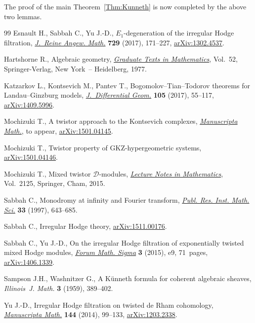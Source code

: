 \documentclass[11pt]{article}
\begin{document}
The proof of the main Theorem~\ref{Thm:Kunneth} is now completed by the above two lemmas.
\begin{thebibliography}{99}
Esnault H., Sabbah C., Yu J.-D., {$E_1$}-degeneration of the irregular {H}odge
 filtration, \href{https://doi.org/10.1515/crelle-2014-0118}{\textit{J.~Reine Angew. Math.}} \textbf{729} (2017), 171--227,
 \href{https://arxiv.org/abs/1302.4537}{arXiv:1302.4537}.

Hartshorne R., Algebraic geometry, \href{https://doi.org/10.1007/978-1-4757-3849-0}{\textit{Graduate Texts in Mathematics}}, Vol.~52, Springer-Verlag, New York~--
 Heidelberg, 1977.

Katzarkov L., Kontsevich M., Pantev T., Bogomolov--{T}ian--{T}odorov theorems
 for {L}andau--{G}inzburg models, \href{https://doi.org/10.4310/jdg/1483655860}{\textit{J.~Differential Geom.}} \textbf{105}
 (2017), 55--117, \href{https://arxiv.org/abs/1409.5996}{arXiv:1409.5996}.

Mochizuki T., A twistor approach to the {K}ontsevich complexes,
 \href{https://doi.org/10.1007/s00229-017-0989-5}{\textit{Manuscripta Math.}}, {t}o appear, \href{https://arxiv.org/abs/1501.04145}{arXiv:1501.04145}.

Mochizuki T., Twistor property of {GKZ}-hypergeometric systems,
 \href{https://arxiv.org/abs/1501.04146}{arXiv:1501.04146}.

Mochizuki T., Mixed twistor {$\mathcal D$}-modules, \href{https://doi.org/10.1007/978-3-319-10088-3}{\textit{Lecture Notes in
 Mathematics}}, Vol.~2125, Springer, Cham, 2015.

Sabbah C., Monodromy at infinity and {F}ourier transform, \href{https://doi.org/10.2977/prims/1195145150}{\textit{Publ. Res.
 Inst. Math. Sci.}} \textbf{33} (1997), 643--685.

Sabbah C., Irregular {H}odge theory, \href{https://arxiv.org/abs/1511.00176}{arXiv:1511.00176}.

Sabbah C., Yu J.-D., On the irregular {H}odge filtration of exponentially
 twisted mixed {H}odge modules, \href{https://doi.org/10.1017/fms.2015.8}{\textit{Forum Math. Sigma}} \textbf{3} (2015),
 e9, 71~pages, \href{https://arxiv.org/abs/1406.1339}{arXiv:1406.1339}.

Sampson J.H., Washnitzer G., A {K}\"unneth formula for coherent algebraic
 sheaves, \textit{Illinois~J. Math.} \textbf{3} (1959), 389--402.

Yu J.-D., Irregular {H}odge filtration on twisted de {R}ham cohomology,
 \href{https://doi.org/10.1007/s00229-013-0642-x}{\textit{Manuscripta Math.}} \textbf{144} (2014), 99--133, \href{https://arxiv.org/abs/1203.2338}{arXiv:1203.2338}.

\end{thebibliography}
\end{document}

